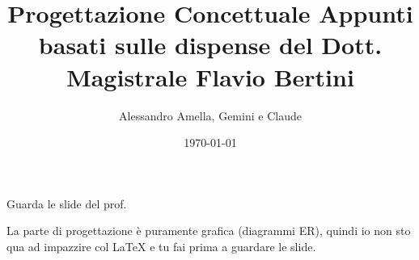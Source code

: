 

\usepackage{hyperref}

\title{Progettazione Concettuale
  \large Appunti basati sulle dispense del Dott. Magistrale Flavio Bertini}
\author{Alessandro Amella, Gemini e Claude}
\date{\today}



Guarda le slide del prof.

La parte di progettazione è puramente grafica (diagrammi ER), quindi io non sto qua ad impazzire col LaTeX e tu fai prima a guardare le slide.

